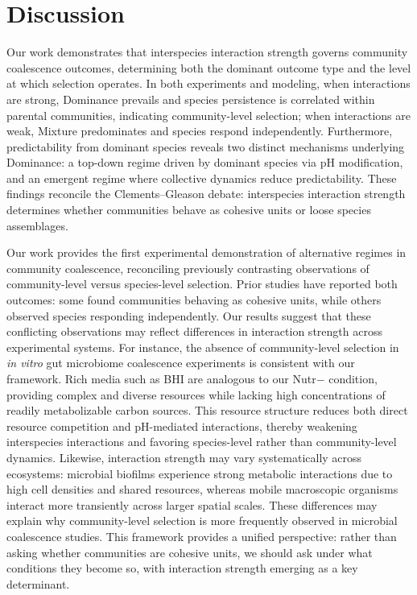 \section{Discussion}
\label{sec:discussion}


Our work demonstrates that interspecies interaction strength governs community coalescence outcomes, determining both the dominant outcome type and the level at which selection operates. In both experiments and modeling, when interactions are strong, Dominance prevails and species persistence is correlated within parental communities, indicating community-level selection; when interactions are weak, Mixture predominates and species respond independently. Furthermore, predictability from dominant species reveals two distinct mechanisms underlying Dominance: a top-down regime driven by dominant species via pH modification, and an emergent regime where collective dynamics reduce predictability. These findings reconcile the Clements--Gleason debate: interspecies interaction strength determines whether communities behave as cohesive units or loose species assemblages.


Our work provides the first experimental demonstration of alternative regimes in community coalescence, reconciling previously contrasting observations of community-level versus species-level selection. Prior studies have reported both outcomes: some found communities behaving as cohesive units\citep{Tikhonov2016, DiazColunga2022}, while others observed species responding independently\citep{VanderGucht2007, Vermeij1991}. Our results suggest that these conflicting observations may reflect differences in interaction strength across experimental systems. For instance, the absence of community-level selection in \textit{in vitro} gut microbiome coalescence experiments\citep{Goldman2025, Walton2025} is consistent with our framework. Rich media such as BHI are analogous to our Nutr$-$ condition, providing complex and diverse resources while lacking high concentrations of readily metabolizable carbon sources. This resource structure reduces both direct resource competition and pH-mediated interactions, thereby weakening interspecies interactions\citep{Ratzke2020} and favoring species-level rather than community-level dynamics. Likewise, interaction strength may vary systematically across ecosystems: microbial biofilms experience strong metabolic interactions due to high cell densities and shared resources\citep{Nadell2016}, whereas mobile macroscopic organisms interact more transiently across larger spatial scales. These differences may explain why community-level selection is more frequently observed in microbial coalescence studies. This framework provides a unified perspective: rather than asking whether communities are cohesive units, we should ask under what conditions they become so, with interaction strength emerging as a key determinant.


